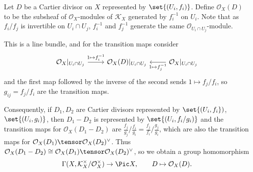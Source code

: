 Let $D$ be a Cartier divisor on $X$ represented by $\set{(U_i, f_i)}$.
Define $\mathcal{O}_X(D)$ to be the subsheaf of $\mathcal{O}_X$-modules of $\mathcal{K}_X$
generated by $f_i^{-1}$ on $U_i$. Note that as $f_i/f_j$ is invertible on $U_i\cap U_j$,
$f_i^{-1}$ and $f_j^{-1}$ generate the same $\mathcal{O}_{U_i\cap U_j}$-module.

This is a line bundle, and for the transition maps consider
\[\begin{tikzcd}
	\mathcal{O}_X|_{U_i\cap U_j} \ar[r, "1\mapsto f_i^{-1}"] & \mathcal{O}_X(D)|_{U_i\cap U_j} & \mathcal{O}_X|_{U_i\cap U_j}\ar[l, "1\mapsto f_j^{-1}"]
\end{tikzcd}\]
and the first map followed by the inverse of the second sends $1\mapsto f_j/f_i$, so
$g_{ij} = f_j/f_i$ are the transition maps.

Consequently, if $D_1, D_2$ are Cartier divisors represented by $\set{(U_i, f_i})$,  $\set{(U_i, g_i)}$,
then $D_1-D_2$ is represented by $\set{(U_i, f_i/g_i)}$ and the transition maps for
$\mathcal{O}_X(D_1-D_2)$ are $\frac{f_j}{g_j}/\frac{f_i}{g_i} = \frac{f_j}{f_i}/\frac{g_j}{g_i}$, which
are also the transition maps for $\mathcal{O}_X(D_1)\tensor \mathcal{O}_X(D_2)^{\vee}$. Thus $\mathcal{O}_X(D_1 - D_2) \cong \mathcal{O}_X(D_1)\tensor \mathcal{O}_X(D_2)^{\vee}$,
so we obtain a group homomorphism
\[ \Gamma(X, \mathcal{K}_X^\times/\mathcal{O}_X^\times)\to \Pic X, \qquad D\mapsto \mathcal{O}_X(D). \]
